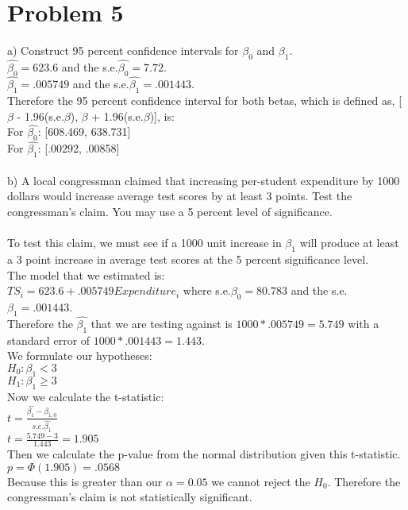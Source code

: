\documentclass[11pt, oneside]{article}   	%
\begin{document}
\section{Problem 5}
a) Construct 95 percent confidence intervals for $\beta_0$ and $\beta_1$.\\
$\hat{\beta_0} = 623.6$ and the s.e.$\hat{\beta_0} = 7.72$.\\
$\hat{\beta_1} = .005749$ and the s.e.$\hat{\beta_1} = .001443$.\\
Therefore the 95 percent confidence interval for both betas, which is defined as, [$\beta$ - 1.96(s.e.$\beta$), $\beta$ + 1.96(s.e.$\beta$)], is:\\
For $\hat{\beta_0}$: [608.469, 638.731]\\
For $\hat{\beta_1}$: [.00292, .00858]\\~\\
b) A local congressman claimed that increasing per-student expenditure by 1000 dollars would increase average test scores by at least 3 points. Test the congressman's claim. You may use a 5 percent level of significance.\\~\\
To test this claim, we must see if a 1000 unit increase in $\beta_1$ will produce at least a 3 point increase in average test scores at the 5 percent significance level.\\
The model that we estimated is:\\
$TS_i = 623.6 + .005749Expenditure_i$ where s.e.$\beta_0 = 80.783$ and the s.e.$\beta_1 = .001443$.\\
Therefore the $\hat{\beta_1}$ that we are testing against is $1000*.005749 = 5.749$ with a standard error of $1000*.001443 = 1.443$.\\
We formulate our hypotheses:\\
$H_0: \beta_1 < 3$\\
$H_1: \beta_1 \geq 3$\\
Now we calculate the t-statistic:\\
$t = \frac{\hat{\beta_1} - \beta_{1,0}}{s.e.\hat{\beta_1}}$\\
$t = \frac{5.749 - 3}{1.443} = 1.905$\\
Then we calculate the p-value from the normal distribution given this t-statistic.\\
$p = \Phi(1.905) = .0568$\\
Because this is greater than our $\alpha = 0.05$ we cannot reject the $H_0$. Therefore the congressman's claim is not statistically significant.\\~\\
\end{document}
